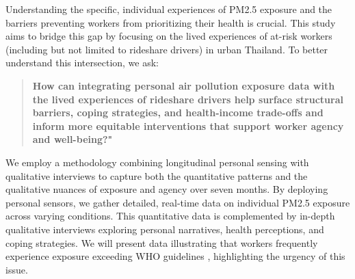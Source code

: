 


Understanding the specific, individual experiences of PM2.5 exposure and the barriers preventing workers from prioritizing their health is crucial.
This study aims to bridge this gap by focusing on the lived experiences of at-risk workers (including but not limited to rideshare drivers) in urban Thailand.
To better understand this intersection, we ask:
\begin{quote}
\textbf{How can integrating personal air pollution exposure data with the lived experiences of rideshare drivers help surface structural barriers, coping strategies, and health-income trade-offs and inform more equitable interventions that support worker agency and well-being?"}
\end{quote}

We employ a methodology combining longitudinal personal sensing with qualitative interviews to capture both the quantitative patterns and the qualitative nuances of exposure and agency over seven months.
By deploying personal sensors, we gather detailed, real-time data on individual PM2.5 exposure across varying conditions.
This quantitative data is complemented by in-depth qualitative interviews exploring personal narratives, health perceptions, and coping strategies.
We will present data illustrating that workers frequently experience exposure exceeding WHO guidelines \cite{who_aqg_2021}, highlighting the urgency of this issue.

